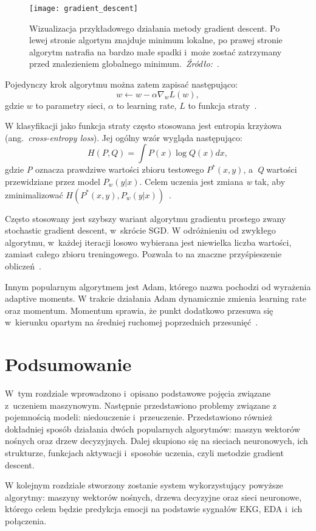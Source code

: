 \begin{figure}[h]
    \centering
    \texttt{[image: gradient\_descent]}
    \caption{Wizualizacja przykładowego działania metody gradient descent. Po lewej stronie algortym znajduje minimum lokalne, po prawej stronie algorytm natrafia na bardzo małe spadki i~może zostać zatrzymany przed znalezieniem globalnego minimum.~\textit{Źródło:~\cite{Geron2019}}.}
    \label{fig:gradient-descent}
\end{figure}

Pojedynczy krok algorytmu można zatem zapisać następująco:
\[w \leftarrow w - \alpha \nabla_{w} L(w),\]
gdzie \(w\) to parametry sieci, \(\alpha\) to learning rate, \(L\) to funkcja straty~\cite{Russell2020}.

W klasyfikacji jako funkcja straty często stosowana jest entropia krzyżowa (ang.~\textit{cross-entropy loss}).
Jej ogólny wzór wygląda następująco:
\[H(P,Q) = \int P(x) \log Q(x)dx,\]
gdzie \textit{P} oznacza prawdziwe wartości zbioru testowego \textit{\(P^*(x, y)\)}, a~\textit{Q} wartości przewidziane przez model \textit{\(P_w(y | x)\)}.
Celem uczenia jest zmiana \textit{w} tak, aby zminimalizować \(H(P^*(x, y),P_w(y | x))\)~\cite{Russell2020}.

Często stosowany jest szybszy wariant algorytmu gradientu prostego zwany stochastic gradient descent, w~skrócie SGD\@.
W odróżnieniu od zwykłego algorytmu, w~każdej iteracji losowo wybierana jest niewielka liczba wartości, zamiast całego zbioru treningowego.
Pozwala to na znaczne przyśpieszenie obliczeń~\cite{Russell2020}.

Innym popularnym algorytmem jest Adam, którego nazwa pochodzi od wyrażenia adaptive moments.
W trakcie działania Adam dynamicznie zmienia learning rate oraz momentum.
Momentum sprawia, że punkt dodatkowo przesuwa się w~kierunku opartym na średniej ruchomej poprzednich przesunięć~\cite{Goodfellow2016}.

\section{Podsumowanie}\label{sec:podsumowanie2}

W~tym rozdziale wprowadzono i~opisano podstawowe pojęcia związane z~uczeniem maszynowym.
Następnie przedstawiono problemy związane z pojemnością modeli: niedouczenie i~przeuczenie.
Przedstawiono również dokładniej sposób działania dwóch popularnych algorytmów: maszyn wektorów nośnych oraz drzew decyzyjnych.
Dalej skupiono się na sieciach neuronowych, ich strukturze, funkcjach aktywacji i~sposobie uczenia, czyli metodzie gradient descent.

W kolejnym rozdziale stworzony zostanie system wykorzystujący powyższe algorytmy: maszyny wektorów nośnych, drzewa decyzyjne oraz sieci neuronowe, którego celem będzie predykcja emocji na podstawie sygnałów EKG, EDA i~ich połączenia.
